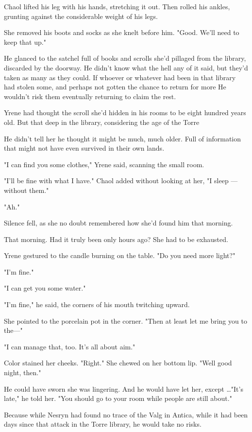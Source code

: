 Chaol lifted his leg with his hands, stretching it out. Then rolled his ankles, grunting against the considerable weight of his legs.

She removed his boots and socks as she knelt before him. "Good. We'll need to keep that up."

He glanced to the satchel full of books and scrolls she'd pillaged from the library, discarded by the doorway. He didn't know what the hell any of it said, but they'd taken as many as they could. If whoever or whatever had been in that library had stolen some, and perhaps not gotten the chance to return for more  He wouldn't risk them eventually returning to claim the rest.

Yrene had thought the scroll she'd hidden in his rooms to be eight hundred years old. But that deep in the library, considering the age of the Torre 

He didn't tell her he thought it might be much, much older. Full of information that might not have even survived in their own lands.

"I can find you some clothes," Yrene said, scanning the small room.

"I'll be fine with what I have." Chaol added without looking at her, "I sleep ---without them."

"Ah."

Silence fell, as she no doubt remembered how she'd found him that morning.

That morning. Had it truly been only hours ago? She had to be exhausted.

Yrene gestured to the candle burning on the table. "Do you need more light?"

"I'm fine."

"I can get you some water."

"I'm fine," he said, the corners of his mouth twitching upward.

She pointed to the porcelain pot in the corner. "Then at least let me bring you to the---"

"I can manage that, too. It's all about aim."

Color stained her cheeks. "Right." She chewed on her bottom lip. "Well  good night, then."

He could have sworn she was lingering. And he would have let her, except
\ldots"It's late," he told her. "You should go to your room while people are still about."

Because while Nesryn had found no trace of the Valg in Antica, while it had been days since that attack in the Torre library, he would take no risks.

